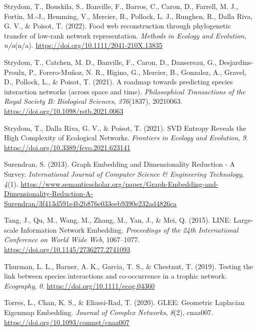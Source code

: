 \documentclass[10pt,oneside]{article}
\newlength{\cslhangindent}
\newenvironment{CSLReferences}[2] %
 {%
  \setlength{\parindent}{0pt}
  \ifodd #1 \everypar{\setlength{\hangindent}{\cslhangindent}}\ignorespaces\fi
  \ifnum #2 > 0
  \setlength{\parskip}{#2\baselineskip}
  \fi
 }%
 {}
\begin{document}
\begin{CSLReferences}{1}{0}
\leavevmode{}%
Strydom, T., Bouskila, S., Banville, F., Barros, C., Caron, D., Farrell,
M. J., Fortin, M.-J., Hemming, V., Mercier, B., Pollock, L. J., Runghen,
R., Dalla Riva, G. V., \& Poisot, T. (2022). Food web reconstruction
through phylogenetic transfer of low-rank network representation.
\emph{Methods in Ecology and Evolution}, \emph{n/a}(n/a).
\url{https://doi.org/10.1111/2041-210X.13835}

\leavevmode{}%
Strydom, T., Catchen, M. D., Banville, F., Caron, D., Dansereau, G.,
Desjardins-Proulx, P., Forero-Muñoz, N. R., Higino, G., Mercier, B.,
Gonzalez, A., Gravel, D., Pollock, L., \& Poisot, T. (2021). A roadmap
towards predicting species interaction networks (across space and time).
\emph{Philosophical Transactions of the Royal Society B: Biological
Sciences}, \emph{376}(1837), 20210063.
\url{https://doi.org/10.1098/rstb.2021.0063}

\leavevmode{}%
Strydom, T., Dalla Riva, G. V., \& Poisot, T. (2021). SVD Entropy
Reveals the High Complexity of Ecological Networks. \emph{Frontiers in
Ecology and Evolution}, \emph{9}.
\url{https://doi.org/10.3389/fevo.2021.623141}

\leavevmode{}%
Surendran, S. (2013). Graph Embedding and Dimensionality Reduction - A
Survey. \emph{International Journal of Computer Science \& Engineering
Technology}, \emph{4}(1).
\url{https://www.semanticscholar.org/paper/Graph-Embedding-and-Dimensionality-Reduction-A-Surendran/3f413d591e4b2b876e033eeb9390e232ad4826ca}

\leavevmode{}%
Tang, J., Qu, M., Wang, M., Zhang, M., Yan, J., \& Mei, Q. (2015). LINE:
Large-scale Information Network Embedding. \emph{Proceedings of the 24th
International Conference on World Wide Web}, 1067--1077.
\url{https://doi.org/10.1145/2736277.2741093}

\leavevmode{}%
Thurman, L. L., Barner, A. K., Garcia, T. S., \& Chestnut, T. (2019).
Testing the link between species interactions and co-occurrence in a
trophic network. \emph{Ecography}, \emph{0}.
\url{https://doi.org/10.1111/ecog.04360}

\leavevmode{}%
Torres, L., Chan, K. S., \& Eliassi-Rad, T. (2020). GLEE: Geometric
Laplacian Eigenmap Embedding. \emph{Journal of Complex Networks},
\emph{8}(2), cnaa007. \url{https://doi.org/10.1093/comnet/cnaa007}


\end{CSLReferences}
\end{document}
